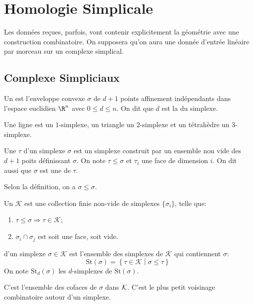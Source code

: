 \section{Homologie Simplicale}
Les données reçues, parfois, vont contenir explicitement la géométrie avec une construction combinatoire.
On supposera qu'on aura une donnée d'entrée linéaire par morceau sur un complexe simplical.

\subsection{Complexe Simpliciaux}
\begin{definition}
	Un  est l'enveloppe convexe $\sigma$ de $d + 1$ points affinement indépendants dans l'espace euclidien $\R^{n}$ avec $0 \leq d \leq n$.
	On dit que $d$ est la  du simplexe.
\end{definition}

Une ligne est un $1$-simplexe, un triangle un $2$-simplexe et un tétrahèdre un $3$-simplexe.

\begin{definition}
	Une  $\tau$ d'un simplexe $\sigma$ est un simplexe construit par un ensemble non vide des $d + 1$ poits définissant $\sigma$.
	On note $\tau \leq \sigma$ et $\tau_{i}$ une face de dimension $i$.
	On dit aussi que $\sigma$ est une  de $\tau$.
\end{definition}
Selon la définition, on a $\sigma \leq \sigma$.

\begin{definition}
	Un  $\mathcal{K}$ est une collection finie non-vide de simplexes $\{\sigma_{i}\}$, telle que:
	\begin{enumerate}
		\item $\tau \leq \sigma \Rightarrow \tau \in \mathcal{K}$;
		\item $\sigma_{i} \cap \sigma_{j}$ est soit une face, soit vide.
	\end{enumerate}
\end{definition}

\begin{definition}
	 d'un simplexe $\sigma \in \mathcal{K}$ est l'ensemble des simplexes de $\mathcal{K}$ qui contiennent $\sigma$:
	\begin{equation*}
		\mathrm{St}(\sigma) = \left\{\tau \in \mathcal{K} \middle| \sigma \leq \tau \right\}
	\end{equation*}
	On note $\mathrm{St}_{d}(\sigma)$ les $d$-simplexes de $\mathrm{St}(\sigma)$.
\end{definition}
C'est l'ensemble des cofaces de $\sigma$ dans $\mathcal{K}$. C'est le plus petit voisinage combinatoire autour d'un simplexe.

